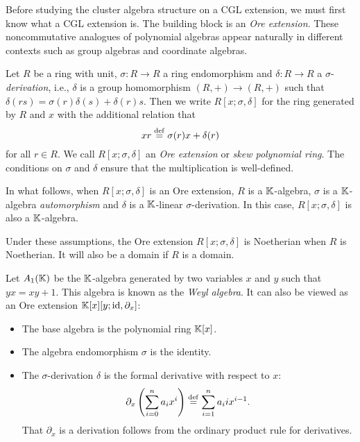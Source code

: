 Before studying the cluster algebra structure on a CGL extension, we must first know
what a CGL extension is. The building block is an \emph{Ore extension}. These
noncommutative analogues of polynomial algebras appear naturally in different contexts
such as group algebras and coordinate algebras.

\begin{definition}
	Let $R$ be a ring with unit, $\sigma \colon R \to R$ a ring endomorphism and
	$\delta \colon R \to R$ a $\sigma$-\emph{derivation}, i.e.,
	$\delta$ is a group homomorphism $(R, +) \to (R, +)$ such that $\delta (r s) =
		\sigma(r)\delta(s) + \delta(r) s$. Then we write $R[x;\sigma, \delta]$ for the ring generated by $R$ and $x$ with the additional relation that
	\begin{equation*}
		x r \overset{\mathrm{def}}{=} \sigma(r) x + \delta(r)
	\end{equation*}
	for all $r \in R$. We call $R[x;\sigma, \delta]$ an \emph{Ore extension} or \emph{skew polynomial ring}. The conditions
	on $\sigma$ and $\delta$ ensure that the multiplication is well-defined.
\end{definition}
%
\begin{convention}
	In what follows, when $R[x;\sigma, \delta]$ is an Ore extension, $R$ is a
	$\mathbb{K}$-algebra, $\sigma$ is a $\mathbb{K}$-algebra \emph{automorphism} and $\delta$ is a
	$\mathbb{K}$-linear $\sigma$-derivation. In this case, $R[x;\sigma, \delta]$ is also a
	$\mathbb{K}$-algebra.
\end{convention}
%
Under these assumptions, the Ore extension $R[x; \sigma, \delta]$ is Noetherian when
$R$ is Noetherian. It will also be a domain if $R$ is a domain.

\begin{example}
	Let $A_1(\mathbb{K})$ be the $\mathbb{K}$-algebra generated by two variables $x$ and $y$ such that $yx =
		xy + 1$. This algebra is known as the \emph{Weyl algebra}. It can
	also be viewed as an Ore extension $\mathbb{K}[x][y; \operatorname{id}, \partial_x]$:
	\begin{itemize}
		\item The base algebra is the polynomial ring $\mathbb{K}[x]$.
		\item The algebra endomorphism $\sigma$ is the identity.
		\item The $\sigma$-derivation $\delta$ is the formal derivative with respect to $x$:
		      \begin{equation*}
			      \partial_x \left(\sum_{i=0}^n a_i x^i \right) \overset{\mathrm{def}}{=} \sum_{i=1}^{n} a_i i x^{i-1}.
		      \end{equation*}
		      That $\partial_x$ is a derivation follows from the ordinary product rule for derivatives.
	\end{itemize}
\end{example}

